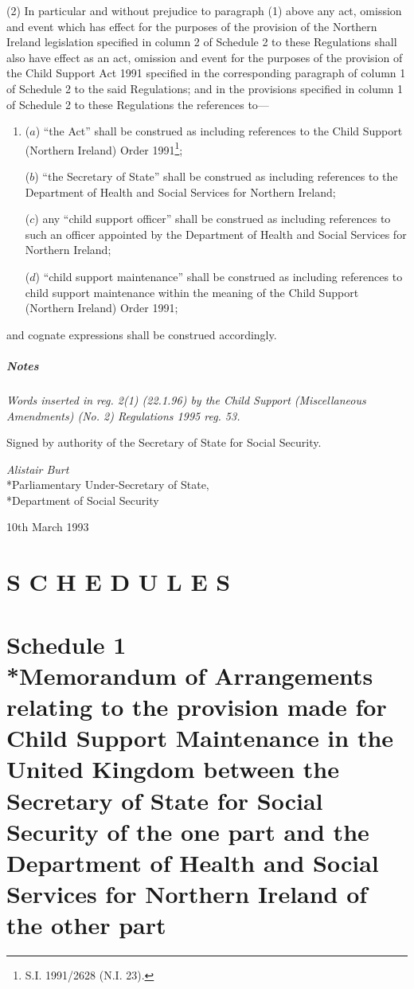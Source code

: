 \documentclass[a4paper]{article}
\newcommand\amendment[1]{\subsubsection*{Notes}{\itshape\frenchspacing\footnotesize #1 \par}}
\begin{document}
(2) In particular and without prejudice to paragraph (1) above any act, omission and event which has effect for the purposes of the provision of the Northern Ireland legislation specified in column 2 of Schedule 2 to these Regulations shall also have effect as an act, omission and event for the purposes of the provision of the Child Support Act 1991 specified in the corresponding paragraph of column 1 of Schedule 2 to the said Regulations; and in the provisions specified in column 1 of Schedule 2 to these Regulations the references to—
\begin{enumerate}\item[]
($a$) “the Act” shall be construed as including references to the Child Support (Northern Ireland) Order 1991\footnote{\frenchspacing S.I. 1991/2628 (N.I. 23).};

($b$) “the Secretary of State” shall be construed as including references to the Department of Health and Social Services for Northern Ireland;

($c$) any “child support officer” shall be construed as including references to such an officer appointed by the Department of Health and Social Services for Northern Ireland;

($d$) “child support maintenance” shall be construed as including references to child support maintenance within the meaning of the Child Support (Northern Ireland) Order 1991;
\end{enumerate}
and cognate expressions shall be construed accordingly.

\amendment{
Words inserted in reg. 2(1) (22.1.96) by the Child Support (Miscellaneous Amendments) (No. 2) Regulations 1995 reg. 53.
}

\bigskip

Signed by authority of the Secretary of State for Social Security.

{\raggedleft
\emph{Alistair Burt}\\*Parliamentary Under-Secretary of State,\\*Department of Social Security

}

10th March 1993

\clearpage

\part*{S C H E D U L E S}

\part[Schedule 1 --- Memorandum of Arrangements relating to the provision made for Child Support Maintenance in the United Kingdom between the Secretary of State for Social Security of the one part and the Department of Health and Social Services for Northern Ireland of the other part]{Schedule 1\\*Memorandum of Arrangements relating to the provision made for Child Support Maintenance in the United Kingdom between the Secretary of State for Social Security of the one part and the Department of Health and Social Services for Northern Ireland of the other part}
\end{document}
